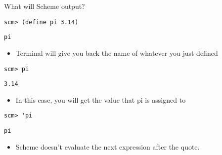 \question What will Scheme output?

\begin{comment}
\begin{lstlisting}
scm> 3.14
\end{lstlisting}
\begin{solution}[0.25in] 
\texttt{3.14}
\end{solution}

\begin{lstlisting}
scm> pi
\end{lstlisting}
\begin{solution}[0.25in]
\texttt{Error}
\end{solution}
\end{comment}

\begin{lstlisting}
scm> (define pi 3.14)
\end{lstlisting}
\begin{solution}[0.25in]
\texttt{pi}
\end{solution}

\begin{guide}
\begin{itemize}
\item Terminal will give you back the name of whatever you just defined
\end{itemize}
\end{guide}

\begin{lstlisting}
scm> pi
\end{lstlisting}
\begin{solution}[.25in]
\texttt{3.14}
\end{solution}
\begin{guide}
\begin{itemize}
\item In this case, you will get the value that pi is assigned to
\end{itemize}
\end{guide}

\begin{lstlisting}
scm> 'pi
\end{lstlisting}
\begin{solution}[.25in]
\texttt{pi}
\end{solution}
\begin{guide}
\begin{itemize}
\item Scheme doesn't evaluate the next expression after the quote.
\end{itemize}
\end{guide}

